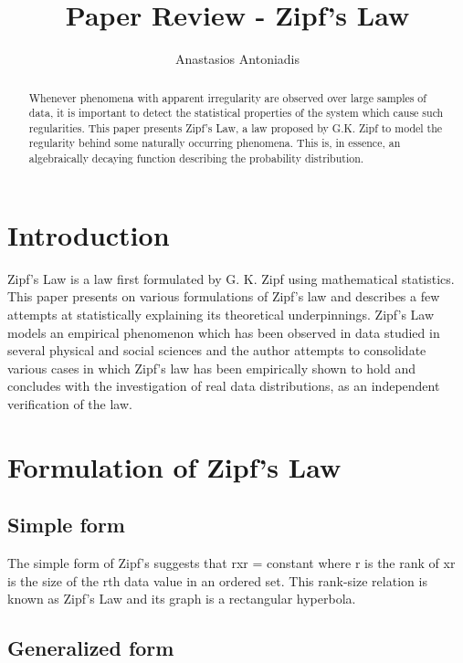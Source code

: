 \documentclass{article} \usepackage{hyperref} \usepackage{graphicx}
\begin{document}
\title{Paper Review - Zipf's Law} \author{Anastasios Antoniadis}

\maketitle

\begin{abstract}

Whenever phenomena with apparent irregularity are observed over large
samples of data, it is important to detect the statistical properties
of the system which cause such regularities. This paper presents
Zipf's Law, a law proposed by G.K. Zipf to model the regularity behind
some naturally occurring phenomena. This is, in essence, an
algebraically decaying function describing the probability
distribution.
\end{abstract}

\section{Introduction}

Zipf's Law is a law first formulated by G. K. Zipf using mathematical
statistics. This paper presents on various formulations of Zipf's law and
describes a few attempts at statistically explaining its theoretical
underpinnings. Zipf's Law models an empirical phenomenon which has been
observed in data studied in several physical and social sciences and the
author attempts to consolidate various cases in which Zipf's law has been
empirically shown to hold and concludes with the investigation of real data
distributions, as an independent verification of the law.

\section{Formulation of Zipf's Law}
\subsection{Simple form}

The simple form of Zipf's suggests that rxr = constant where r is the
rank of xr is the size of the rth data value in an ordered set. This
rank-size relation is known as Zipf's Law and its graph is a
rectangular hyperbola.

\subsection{Generalized form}
\end{document}
